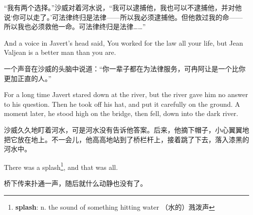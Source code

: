 \documentclass[fontset=ubuntu, zihao=5]{ctexart}
\begin{document}
\begin{paracol}{2}
\switchcolumn

“我有两个选择。”沙威对着河水说，“我可以逮捕他，我也可以不逮捕他，并对他说‘你可以走了。’可法律终归是法律——所以我必须逮捕他。但他救过我的命——所以我也必须救他一命。可法律终归是法律……”

\switchcolumn*

And a voice in Javert's head said, You worked for the law all your life, but Jean Valjean is a better man than you are.

\switchcolumn

一个声音在沙威的头脑中说道：“你一辈子都在为法律服务，可冉阿让是一个比你更加正直的人。”
\switchcolumn*

For a long time Javert stared down at the river, but the river gave him no answer to his question. Then he took off his hat, and put it carefully on the ground. A moment later, he stood high on the bridge, then fell, down into the dark river.

\switchcolumn

沙威久久地盯着河水，可是河水没有告诉他答案。后来，他摘下帽子，小心翼翼地把它放在地上。不一会儿，他高高地站到了桥栏杆上，接着跳了下去，落入漆黑的河水中。

\switchcolumn*

There was a splash\footnote{\textbf{splash}: n. the sound of something
  hitting water （水的）溅泼声}, and that was all.

\switchcolumn

桥下传来扑通一声，随后就什么动静也没有了。

\end{paracol}

\clearpage
\end{document}
